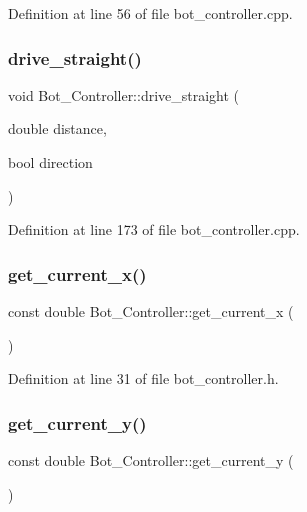Definition at line 56 of file bot\+\_\+controller.\+cpp.

\mbox{\label{class_bot___controller_aacde4d9a862dfa0fc029686a66603de7}} 
\subsubsection{\texorpdfstring{drive\+\_\+straight()}{drive\_straight()}}
{\footnotesize\ttfamily void Bot\+\_\+\+Controller\+::drive\+\_\+straight (\begin{DoxyParamCaption}\item[{double}]{distance,  }\item[{bool}]{direction }\end{DoxyParamCaption})}



Definition at line 173 of file bot\+\_\+controller.\+cpp.

\mbox{\label{class_bot___controller_a2efd33efbb2d3c8caa52e04a049b5971}} 
\subsubsection{\texorpdfstring{get\+\_\+current\+\_\+x()}{get\_current\_x()}}
{\footnotesize\ttfamily const double Bot\+\_\+\+Controller\+::get\+\_\+current\+\_\+x (\begin{DoxyParamCaption}{ }\end{DoxyParamCaption})\hspace{0.3cm}{\ttfamily [inline]}}



Definition at line 31 of file bot\+\_\+controller.\+h.

\mbox{\label{class_bot___controller_a5985b03ff6787846a5abf5cd85ed6ae2}} 
\subsubsection{\texorpdfstring{get\+\_\+current\+\_\+y()}{get\_current\_y()}}
{\footnotesize\ttfamily const double Bot\+\_\+\+Controller\+::get\+\_\+current\+\_\+y (\begin{DoxyParamCaption}{ }\end{DoxyParamCaption})\hspace{0.3cm}{\ttfamily [inline]}}



